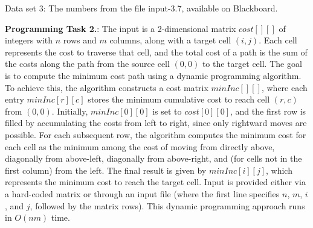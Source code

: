 \documentclass[11pt]{article}
\begin{document}
Data set 3:  The  numbers from the file input-3.7, available on Blackboard. 

\pagebreak


\textbf{Programming Task 2.}: The input is a 2-dimensional matrix $cost[][]$ of integers with $n$ rows and $m$ columns, along with a target cell $(i,j)$. Each cell represents the cost to traverse that cell, and the total cost of a path is the sum of the costs along the path from the source cell $(0,0)$ to the target cell. The goal is to compute the minimum cost path using a dynamic programming algorithm. To achieve this, the algorithm constructs a cost matrix $minInc[][]$, where each entry $minInc[r][c]$ stores the minimum cumulative cost to reach cell $(r,c)$ from $(0,0)$. Initially, $minInc[0][0]$ is set to $cost[0][0]$, and the first row is filled by accumulating the costs from left to right, since only rightward moves are possible. For each subsequent row, the algorithm computes the minimum cost for each cell as the minimum among the cost of moving from directly above, diagonally from above-left, diagonally from above-right, and (for cells not in the first column) from the left. The final result is given by $minInc[i][j]$, which represents the minimum cost to reach the target cell. Input is provided either via a hard-coded matrix or through an input file (where the first line specifies $n$, $m$, $i$, and $j$, followed by the matrix rows). This dynamic programming approach runs in $O(nm)$ time.
\end{document}
